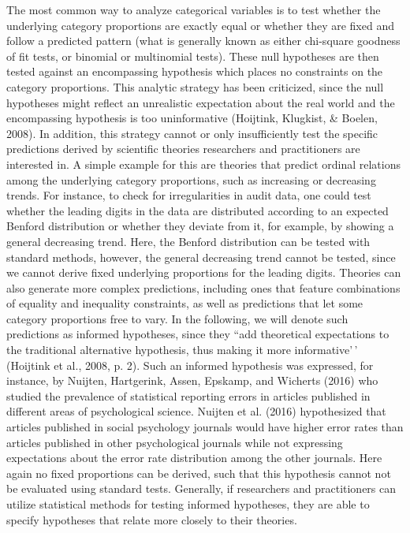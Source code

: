 \documentclass[
  english,
  man,floatsintext]{apa6}
\begin{document}
The most common way to analyze categorical variables is to test whether the underlying category proportions are exactly equal or whether they are fixed and follow a predicted pattern (what is generally known as either chi-square goodness of fit tests, or binomial or multinomial tests). These null hypotheses are then tested against an encompassing hypothesis which places no constraints on the category proportions. This analytic strategy has been criticized, since the null hypotheses might reflect an unrealistic expectation about the real world and the encompassing hypothesis is too uninformative (Hoijtink, Klugkist, \& Boelen, 2008). In addition, this strategy cannot or only insufficiently test the specific predictions derived by scientific theories researchers and practitioners are interested in. A simple example for this are theories that predict ordinal relations among the underlying category proportions, such as increasing or decreasing trends. For instance, to check for irregularities in audit data, one could test whether the leading digits in the data are distributed according to an expected Benford distribution or whether they deviate from it, for example, by showing a general decreasing trend. Here, the Benford distribution can be tested with standard methods, however, the general decreasing trend cannot be tested, since we cannot derive fixed underlying proportions for the leading digits. Theories can also generate more complex predictions, including ones that feature combinations of equality and inequality constraints, as well as predictions that let some category proportions free to vary. In the following, we will denote such predictions as informed hypotheses, since they ``add theoretical expectations to the traditional alternative hypothesis, thus making it more informative'\,' (Hoijtink et al., 2008, p. 2). Such an informed hypothesis was expressed, for instance, by Nuijten, Hartgerink, Assen, Epskamp, and Wicherts (2016) who studied the prevalence of statistical reporting errors in articles published in different areas of psychological science. Nuijten et al. (2016) hypothesized that articles published in social psychology journals would have higher error rates than articles published in other psychological journals while not expressing expectations about the error rate distribution among the other journals. Here again no fixed proportions can be derived, such that this hypothesis cannot not be evaluated using standard tests. Generally, if researchers and practitioners can utilize statistical methods for testing informed hypotheses, they are able to specify hypotheses that relate more closely to their theories.
\end{document}
